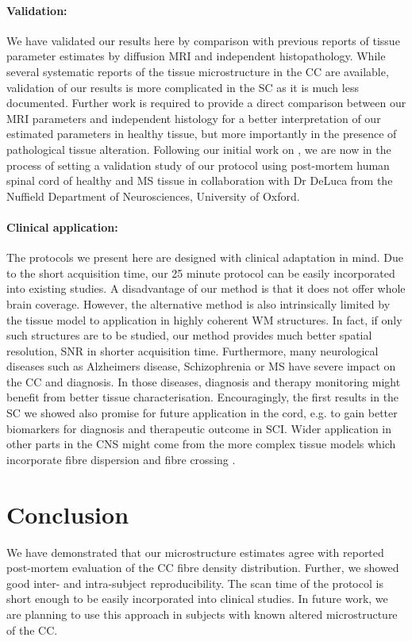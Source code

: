 \paragraph{Validation: } We have validated our results here by comparison with previous reports of tissue parameter estimates by diffusion MRI and independent histopathology. While several systematic reports of the tissue microstructure in the \gls{CC} are available, validation of our results is more complicated in the SC as it is much less documented. Further work is required to provide a direct comparison between our MRI parameters and independent histology for a better interpretation of our estimated parameters in healthy tissue, but more importantly in the presence of pathological tissue alteration. Following our initial work on \SFasym{}, we are now in the process of setting a validation study of our protocol using post-mortem human spinal cord of healthy and MS tissue in collaboration with Dr DeLuca from the Nuffield Department of Neurosciences, University of Oxford.

\paragraph{Clinical application: } The protocols we present here are designed with clinical adaptation in mind. Due to the short acquisition time, our 25 minute protocol can be easily incorporated into existing studies. A disadvantage of our method is that it does not offer whole brain coverage. However, the alternative \OI{} method is also intrinsically limited by the tissue model to application in highly coherent WM structures. In fact, if only such structures are to be studied, our method provides much better spatial resolution, \gls{SNR} in shorter acquisition time. Furthermore, many neurological diseases such as Alzheimers disease, Schizophrenia or MS have severe impact on the \gls{CC} and diagnosis. In those diseases, diagnosis and therapy monitoring might benefit from better tissue characterisation. Encouragingly, the first results in the SC we showed also promise for future application in the cord, e.g. to gain better biomarkers for diagnosis and therapeutic outcome in SCI. Wider application in other parts in the CNS might come from the more complex tissue models which incorporate fibre dispersion and fibre crossing \citep{Zhang:2011,Zhang:2011b,Sotiropoulos:2012,Zhang:2012}.

\section{Conclusion}
We have demonstrated that our microstructure estimates agree with reported post-mortem evaluation of the \gls{CC} fibre density distribution. Further, we showed good inter- and intra-subject reproducibility. The scan time of the protocol is short enough to be easily incorporated into clinical studies. In future work, we are planning to use this approach in subjects with known altered microstructure of the \gls{CC}.